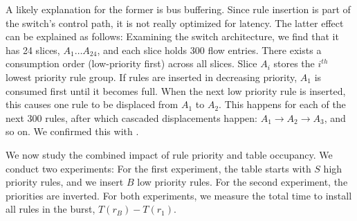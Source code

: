 A likely explanation for the former is bus buffering. Since rule insertion is 
part  of the switch's control path, it is not really optimized for latency.
The latter effect can be explained as follows: Examining the \Intel switch architecture, we
find that it has 24 slices, $A_1\ldots A_{24}$, and each slice holds 300
flow entries. There exists a consumption order (low-priority first) across
all slices.  Slice $A_i$ stores the $i^{th}$ lowest priority rule group. If
rules are inserted in decreasing priority, $A_1$ is consumed first until it
becomes full. When the next low priority rule is inserted, this causes one
rule to be displaced from $A_1$ to $A_2$.  This happens for each of the next
300 rules, after which cascaded displacements happen: $A_1 \rightarrow A_2
\rightarrow A_3$, and so on. We confirmed this with \Intel.




We now study the combined impact of rule priority and table occupancy.
We conduct two experiments: For the first experiment, the table starts with
$S$ high priority rules, and we insert $B$ low priority rules.  For the
second experiment, the priorities are inverted.
For both experiments, we measure the total time to install all rules in the
burst, $T(r_B)-T(r_1)$.

